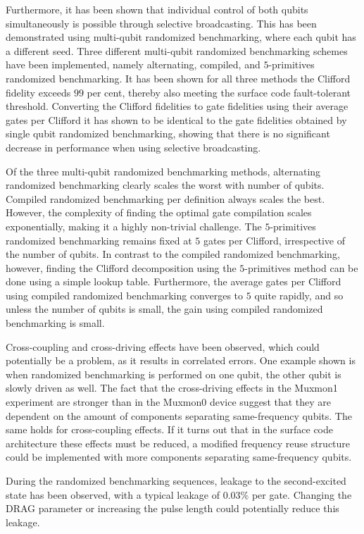     Furthermore, it has been shown that individual control of both qubits simultaneously is possible through selective broadcasting. This has been demonstrated using multi-qubit randomized benchmarking, where each qubit has a different seed. Three different multi-qubit randomized benchmarking schemes have been implemented, namely alternating, compiled, and $5$-primitives randomized benchmarking. It has been shown for all three methods the Clifford fidelity exceeds $99$ per cent, thereby also meeting the surface code fault-tolerant threshold. Converting the Clifford fidelities to gate fidelities using their average gates per Clifford it has shown to be identical to the gate fidelities obtained by single qubit randomized benchmarking, showing that there is no significant decrease in performance when using selective broadcasting.

    Of the three multi-qubit randomized benchmarking methods, alternating randomized benchmarking clearly scales the worst with number of qubits. Compiled randomized benchmarking per definition always scales the best. However, the complexity of finding the optimal gate compilation scales exponentially, making it a highly non-trivial challenge. The $5$-primitives randomized benchmarking remains fixed at $5$ gates per Clifford, irrespective of the number of qubits. In contrast to the compiled randomized benchmarking, however, finding the Clifford decomposition using the $5$-primitives method can be done using a simple lookup table. Furthermore, the average gates per Clifford using compiled randomized benchmarking converges to $5$ quite rapidly, and so unless the number of qubits is small, the gain using compiled randomized benchmarking is small.

    Cross-coupling and cross-driving effects have been observed, which could potentially be a problem, as it results in correlated errors. One example shown is when randomized benchmarking is performed on one qubit, the other qubit is slowly driven as well. The fact that the cross-driving effects in the Muxmon1 experiment are stronger than in the Muxmon0 device suggest that they are dependent on the amount of components separating same-frequency qubits. The same holds for cross-coupling effects. If it turns out that in the surface code architecture these effects must be reduced, a modified frequency reuse structure could be implemented with more components separating same-frequency qubits.

    During the randomized benchmarking sequences, leakage to the second-excited state has been observed, with a typical leakage of $0.03\%$ per gate. Changing the DRAG parameter or increasing the pulse length could potentially reduce this leakage.

